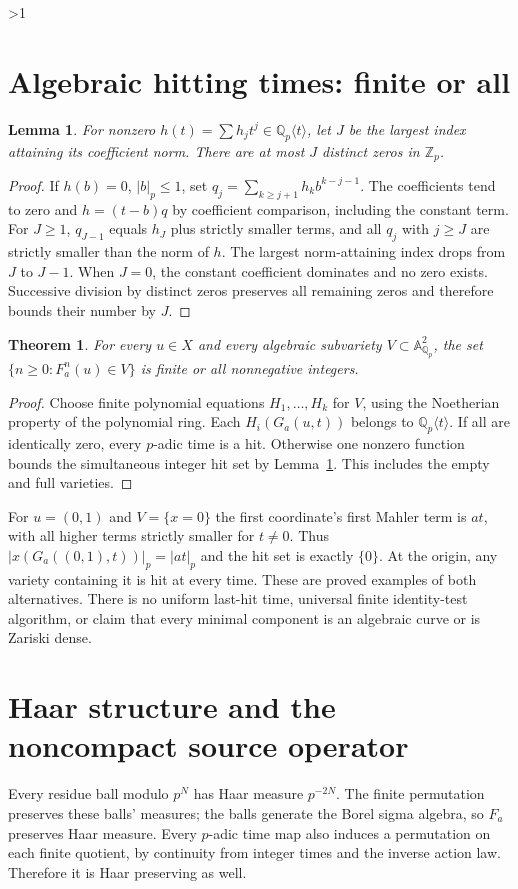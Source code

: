 \documentclass[10pt]{article}
\newtheorem{theorem}{Theorem}
\newtheorem{lemma}{Lemma}
\newcommand{\Zp}{\mathbb Z_p}
\newcommand{\Qp}{\mathbb Q_p}
\begin{document}
\ifnum\CRevisionRound>1
\section{Algebraic hitting times: finite or all}
\begin{lemma}\label{zeros}
For nonzero $h(t)=\sum h_jt^j\in\Qp\langle t\rangle$, let $J$ be the
largest index attaining its coefficient norm. There are at most $J$
distinct zeros in $\Zp$.
\end{lemma}
\begin{proof}
If $h(b)=0$, $|b|_p\le1$, set
$q_j=\sum_{k\ge j+1}h_kb^{k-j-1}$. The coefficients tend to zero and
$h=(t-b)q$ by coefficient comparison, including the constant term.
For $J\ge1$, $q_{J-1}$ equals $h_J$ plus strictly smaller terms, and all
$q_j$ with $j\ge J$ are strictly smaller than the norm of $h$.
The largest norm-attaining index drops from $J$ to $J-1$.
When $J=0$, the constant coefficient dominates and no zero exists.
Successive division by distinct zeros preserves all remaining zeros and
therefore bounds their number by $J$.
\end{proof}
\begin{theorem}\label{hitting}
For every $u\in X$ and every algebraic subvariety
$V\subset\mathbb A^2_{\Qp}$, the set
$\{n\ge0:F_a^n(u)\in V\}$ is finite or all nonnegative integers.
\end{theorem}
\begin{proof}
Choose finite polynomial equations $H_1,\ldots,H_k$ for $V$, using the
Noetherian property of the polynomial ring. Each
$H_i(G_a(u,t))$ belongs to $\Qp\langle t\rangle$.
If all are identically zero, every $p$-adic time is a hit.
Otherwise one nonzero function bounds the simultaneous integer hit set
by Lemma~\ref{zeros}. This includes the empty and full varieties.
\end{proof}
For $u=(0,1)$ and $V=\{x=0\}$ the first coordinate's first Mahler term
is $at$, with all higher terms strictly smaller for $t\ne0$.
Thus $|x(G_a((0,1),t))|_p=|at|_p$ and the hit set is exactly $\{0\}$.
At the origin, any variety containing it is hit at every time.
These are proved examples of both alternatives. There is no uniform
last-hit time, universal finite identity-test algorithm, or claim that
every minimal component is an algebraic curve or is Zariski dense.

\section{Haar structure and the noncompact source operator}
Every residue ball modulo $p^N$ has Haar measure $p^{-2N}$.
The finite permutation preserves these balls' measures; the balls
generate the Borel sigma algebra, so $F_a$ preserves Haar measure.
Every $p$-adic time map also induces a permutation on each finite
quotient, by continuity from integer times and the inverse action law.
Therefore it is Haar preserving as well.
\end{document}
